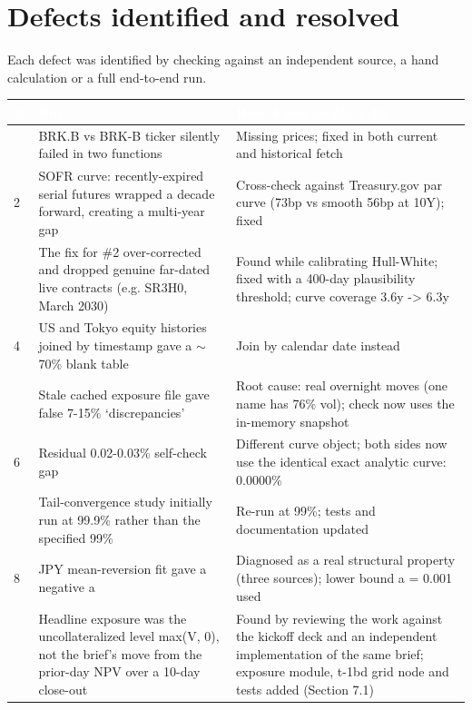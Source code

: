 \documentclass[11pt,letterpaper]{article}
\begin{document}
\clearpage
\section{Defects identified and resolved}
Each defect was identified by checking against an independent source, a hand calculation or a full end-to-end run.

{\scriptsize\setlength{\LTpre}{4pt}\setlength{\LTpost}{6pt}
\begin{longtable}{>{\raggedright\arraybackslash}p{}>{\raggedright\arraybackslash}p{}>{\raggedright\arraybackslash}p{}}
\toprule
\rowcolor{navy}\textbf{\textcolor{white}{\#}} & \textbf{\textcolor{white}{Bug}} & \textbf{\textcolor{white}{How it was caught / fix}} \\
\endhead
1 & BRK.B vs BRK-B ticker silently failed in two functions & Missing prices; fixed in both current and historical fetch \\
\rowcolor{gray!9}2 & SOFR curve: recently-expired serial futures wrapped a decade forward, creating a multi-year gap & Cross-check against Treasury.gov par curve (73bp vs smooth 56bp at 10Y); fixed \\
3 & The fix for \#2 over-corrected and dropped genuine far-dated live contracts (e.g. SR3H0, March 2030) & Found while calibrating Hull-White; fixed with a 400-day plausibility threshold; curve coverage 3.6y -\textgreater{} 6.3y \\
\rowcolor{gray!9}4 & US and Tokyo equity histories joined by timestamp gave a $\sim$70\% blank table & Join by calendar date instead \\
5 & Stale cached exposure file gave false 7-15\% `discrepancies' & Root cause: real overnight moves (one name has 76\% vol); check now uses the in-memory snapshot \\
\rowcolor{gray!9}6 & Residual 0.02-0.03\% self-check gap & Different curve object; both sides now use the identical exact analytic curve: 0.0000\% \\
7 & Tail-convergence study initially run at 99.9\% rather than the specified 99\% & Re-run at 99\%; tests and documentation updated \\
\rowcolor{gray!9}8 & JPY mean-reversion fit gave a negative a & Diagnosed as a real structural property (three sources); lower bound a = 0.001 used \\
9 & Headline exposure was the uncollateralized level max(V, 0), not the brief's move from the prior-day NPV over a 10-day close-out & Found by reviewing the work against the kickoff deck and an independent implementation of the same brief; exposure module, t-1bd grid node and tests added (Section 7.1) \\

\end{longtable}}
\end{document}
